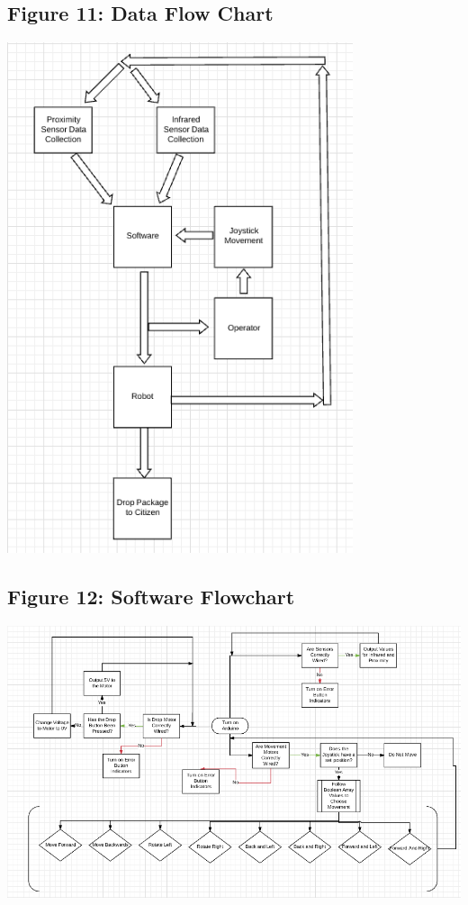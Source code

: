 \documentclass{article}
\begin{document}
\subsection{Figure 11: Data Flow Chart}
\begin{center}{ \includegraphics[height=15cm]{DataFlow.png}}\end{center}

\subsection{Figure 12: Software Flowchart}
\begin{center}{ \includegraphics[width=\textwidth]{SoftwareFlowchart.png}}\end{center}
\end{document}
